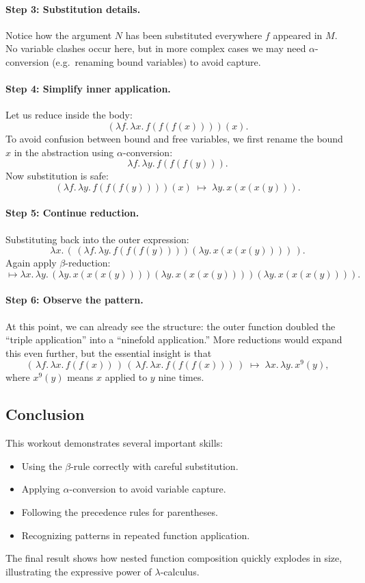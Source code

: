 \documentclass[11pt]{article}
\begin{document}
\paragraph{Step 3: Substitution details.}
Notice how the argument $N$ has been substituted everywhere $f$ appeared in $M$.
No variable clashes occur here, but in more complex cases we may need $\alpha$-conversion
(e.g.\ renaming bound variables) to avoid capture.

\paragraph{Step 4: Simplify inner application.}
Let us reduce inside the body:
\[
  (\lambda f.\,\lambda x.\,f(f(f(x))))(x).
\]
To avoid confusion between bound and free variables, we first rename the bound $x$
in the abstraction using $\alpha$-conversion:
\[
  \lambda f.\,\lambda y.\,f(f(f(y))).
\]
Now substitution is safe:
\[
  (\lambda f.\,\lambda y.\,f(f(f(y))))(x) \;\mapsto\; \lambda y.\,x(x(x(y))).
\]

\paragraph{Step 5: Continue reduction.}
Substituting back into the outer expression:
\[
  \lambda x.\,(\,(\lambda f.\,\lambda y.\,f(f(f(y))))(\lambda y.\,x(x(x(y))))\,).
\]
Again apply $\beta$-reduction:
\[
  \mapsto \lambda x.\,\lambda y.\,(\lambda y.\,x(x(x(y))))(\lambda y.\,x(x(x(y))))(\lambda y.\,x(x(x(y)))).
\]

\paragraph{Step 6: Observe the pattern.}
At this point, we can already see the structure:  
the outer function doubled the “triple application” into a “ninefold application.”  
More reductions would expand this even further, but the essential insight is that
\[
  (\,\lambda f.\,\lambda x.\,f(f(x))\,)\,(\,\lambda f.\,\lambda x.\,f(f(f(x)))\,)
  \;\mapsto\; \lambda x.\,\lambda y.\,x^{9}(y),
\]
where $x^{9}(y)$ means $x$ applied to $y$ nine times.

\subsection*{Conclusion}
This workout demonstrates several important skills:
\begin{itemize}
  \item Using the $\beta$-rule correctly with careful substitution.
  \item Applying $\alpha$-conversion to avoid variable capture.
  \item Following the precedence rules for parentheses.
  \item Recognizing patterns in repeated function application.
\end{itemize}
The final result shows how nested function composition quickly explodes in size,
illustrating the expressive power of $\lambda$-calculus.
\end{document}
